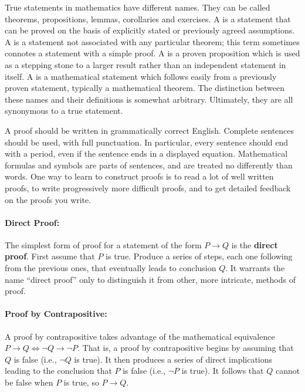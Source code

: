 True statements in mathematics have different names.
They can be called theorems, propositions, lemmas, corollaries and exercises.
A  is a statement that can be proved on the basis of explicitly stated or previously agreed assumptions.
A  is a statement not associated with any particular theorem; this term sometimes connotes a statement with a simple proof.
A  is a proven proposition which is used as a stepping stone to a larger result rather than an independent statement in itself.
A  is a mathematical statement which follows easily from a previously proven statement, typically a mathematical theorem. 
The distinction between these names and their definitions is somewhat arbitrary.
Ultimately, they are all synonymous to a true statement.

A proof should be written in grammatically correct English.
Complete sentences should be used, with full punctuation.
In particular, every sentence should end with a period, even if the sentence ends in a displayed equation.
Mathematical formulas and symbols are parts of sentences, and are treated no differently than words.
One way to learn to construct proofs is to read a lot of well written proofs, to write progressively more difficult proofs, and to get detailed feedback on the proofs you write.


\paragraph{Direct Proof:}

The simplest form of proof for a statement of the form $P \rightarrow Q$ is the \textbf{direct proof}.
First assume that $P$ is true.
Produce a series of steps, each one following from the previous ones, that eventually leads to conclusion $Q$.
It warrants the name ``direct proof'' only to distinguish it from other, more intricate, methods of proof.

\paragraph{Proof by Contrapositive:}
A proof by contrapositive takes advantage of the mathematical equivalence $P \rightarrow Q \Leftrightarrow \neg Q \rightarrow \neg P$.
That is, a proof by contrapositive begins by assuming that $Q$ is false (i.e., $\neg Q$ is true).
It then produces a series of direct implications leading to the conclusion that $P$ is false (i.e., $\neg P$ is true).
It follows that $Q$ cannot be false when $P$ is true, so $P \rightarrow Q$.

